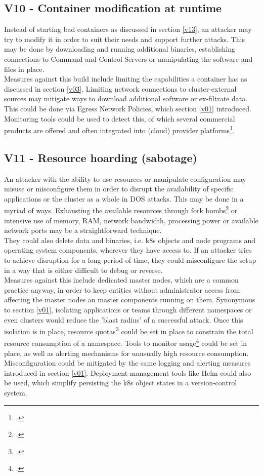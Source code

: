 \subsection{V10 - Container modification at runtime} \label{v10}
Instead of starting bad containers as discussed in section \ref{v13}, an attacker may try to modify it in order to suit their needs and support further attacks.
This may be done by downloading and running additional binaries, establishing connections to Command and Control Servers or manipulating the software and files in place. \\
Measures against this build include limiting the capabilities a container has as discussed in section \ref{v03}. Limiting network connections to cluster-external sources may mitigate ways to download additional software or ex-filtrate data. This could be done via Egress Network Policies, which section \ref{v01} introduced.
Monitoring tools could be used to detect this, of which several commercial products are offered and often integrated into (cloud) provider platforms\footcite[][, slide 40 to 41]{runtimeProt}.

\subsection{V11 - Resource hoarding (sabotage)} \label{v11}
An attacker with the ability to use resources or manipulate configuration may misuse or misconfigure them in order to disrupt the availability of specific applications or the cluster as a whole in DOS attacks.
This may be done in a myriad of ways. Exhausting the available resources through fork bombs\footcite[][, chapter 'Fork Bombs and Resource-Based Attacks']{k8sBook} or intensive use of memory, RAM, network bandwidth, processing power or available network ports may be a straightforward technique. \\
They could also delete data and binaries, i.e. \gls{k8s} objects and node programs and operating system components, wherever they have access to.
If an attacker tries to achieve disruption for a long period of time, they could misconfigure the setup in a way that is either difficult to debug or reverse. \\
Measures against this include dedicated master nodes, which are a common practice anyway, in order to keep entities without administrator access from affecting the master nodes an master components running on them. Synonymous to section \ref{v01}, isolating applications or teams through different namespaces or even clusters would reduce the 'blast radius' of a successful attack. Once this isolation is in place, resource quotas\footcite[][, section 'Viewing and Setting Quotas']{resourceQuota} could be set in place to constrain the total resource consumption of a namespace. Tools to monitor usage\footcite[][, first paragraph]{k8sResourceMonitoring} could be set in place, as well as alerting mechanisms for unusually high resource consumption. Misconfiguration could be mitigated by the same logging and alerting measures introduced in section \ref{v01}. Deployment management tools like Helm could also be used, which simplify persisting the \gls{k8s} object states in a version-control system.


